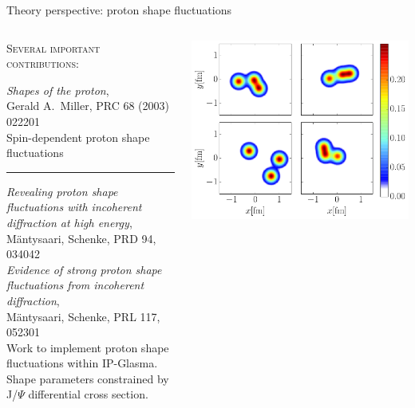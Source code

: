 \documentclass{beamer}
\begin{document}
\begin{frame}{Theory perspective: proton shape fluctuations}
  \medskip
  \begin{columns}
    \begin{column}{.6\textwidth}
      {\color{theme} \scshape Several important contributions:} \\[1ex]
      {\small
      \emph{Shapes of the proton},\\Gerald A.\ Miller, PRC 68 (2003) 022201 \\[1ex]
      {\color{theme} Spin-dependent proton shape fluctuations}\\
      \medskip\hrule\medskip
      \emph{Revealing proton shape fluctuations with incoherent diffraction at high energy},\\ M\"antysaari, Schenke, PRD 94, 034042 \\[1ex]
      \emph{Evidence of strong proton shape fluctuations from incoherent diffraction},\\ M\"antysaari, Schenke, PRL 117, 052301 \\[1ex]
      {\color{theme} Work to implement proton shape fluctuations within IP-Glasma. Shape parameters constrained by J/$\Psi$ differential cross section.}
      }%
    \end{column}
    \begin{column}{.4\textwidth}
      \centering
      \includegraphics[width=.9\columnwidth]{density_lumpy}\\

\end{column}
\end{columns}
\end{frame}
\end{document}
